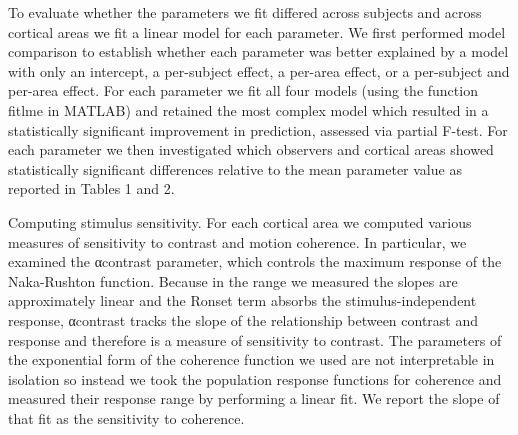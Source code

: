 \documentclass{report}
\begin{document}
To evaluate whether the parameters we fit differed across subjects and across cortical areas we fit a linear model for each parameter. We first performed model comparison to establish whether each parameter was better explained by a model with only an intercept, a per-subject effect, a per-area effect, or a per-subject and per-area effect. For each parameter we fit all four models (using the function fitlme in MATLAB) and retained the most complex model which resulted in a statistically significant improvement in prediction, assessed via partial F-test. For each parameter we then investigated which observers and cortical areas showed statistically significant differences relative to the mean parameter value as reported in Tables 1 and 2.

Computing stimulus sensitivity.
For each cortical area we computed various measures of sensitivity to contrast and motion coherence. In particular, we examined the αcontrast parameter, which controls the maximum response of the Naka-Rushton function. Because in the range we measured the slopes are approximately linear and the Ronset term absorbs the stimulus-independent response, αcontrast tracks the slope of the relationship between contrast and response and therefore is a measure of sensitivity to contrast. The parameters of the exponential form of the coherence function we used are not interpretable in isolation so instead we took the population response functions for coherence and measured their response range by performing a linear fit. We report the slope of that fit as the sensitivity to coherence.
\end{document}
